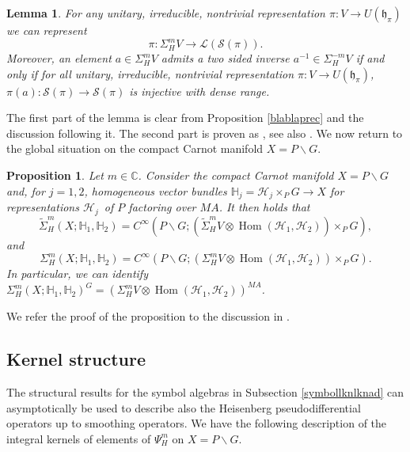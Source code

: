\documentclass[a4paper,reqno]{amsart}
\numberwithin{equation}{section}
\def\Hom{\operatorname{Hom}}
\def\C{\mathbb{C}}
\newtheorem{lemma}[thm]{Lemma}
\newtheorem{prop}[thm]{Proposition}
\theoremstyle{definition}
\theoremstyle{remark}
\begin{document}
\begin{lemma}
\label{christlemma}
For any unitary, irreducible, nontrivial representation $\pi:V\to U(\mathfrak{h}_\pi)$ we can represent 
$$\pi:\Sigma_H^mV\to \mathcal{L}(\mathcal{S}(\pi)).$$
Moreover, an element $a\in \Sigma_H^mV$ admits a two sided inverse $a^{-1}\in \Sigma_H^{-m}V$ if and only if for all unitary, irreducible, nontrivial representation $\pi:V\to U(\mathfrak{h}_\pi)$, $\pi(a):\mathcal{S}(\pi)\to \mathcal{S}(\pi)$ is injective with dense range. 
\end{lemma}

The first part of the lemma is clear from Proposition \ref{blablaprec} and the discussion following it. The second part is proven as \cite[Theorem 6.2]{christgelleretal}, see also \cite[Lemma 3.9]{Dave_Haller1}. We now return to the global situation on the compact Carnot manifold $X=P\backslash G$.  

\begin{prop}
\label{gequicad}
Let $m\in \C$. Consider the compact Carnot manifold $X=P\backslash G$ and, for $j=1,2$, homogeneous vector bundles $\mathbb{H}_j=\mathcal{H}_j\times_P G\to X$ for representations $\mathcal{H}_j$ of $P$ factoring over $MA$. It then holds that 
$$\tilde{\Sigma}_H^m(X;\mathbb{H}_1,\mathbb{H}_2)=C^\infty(P\backslash G; (\tilde{\Sigma}_H^mV \otimes \Hom(\mathcal{H}_1,\mathcal{H}_2))\times_PG),$$
and 
$$\Sigma_H^m(X;\mathbb{H}_1,\mathbb{H}_2)=C^\infty(P\backslash G; (\Sigma_H^mV \otimes \Hom(\mathcal{H}_1,\mathcal{H}_2))\times_PG).$$
In particular, we can identify $\Sigma_H^m(X;\mathbb{H}_1,\mathbb{H}_2)^G=(\Sigma_H^mV \otimes \Hom(\mathcal{H}_1,\mathcal{H}_2))^{MA}$.  
\end{prop}

We refer the proof of the proposition to the discussion in \cite[Section 4.7]{goffbgg}.


\subsection{Kernel structure}

The structural results for the symbol algebras in Subsection \ref{symbollknlknad} can asymptotically be used to describe also the Heisenberg pseudodifferential operators up to smoothing operators. We have the following description of the integral kernels of elements of $\Psi^m_H$ on $X=P\backslash G$.
\end{document}

